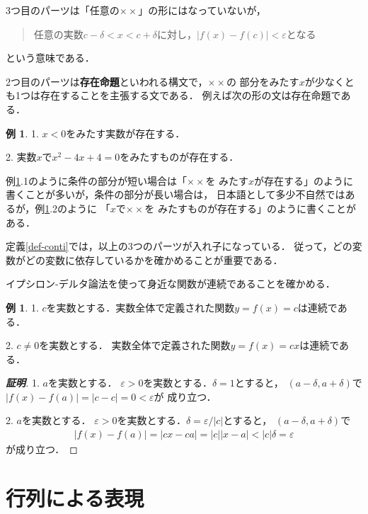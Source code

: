 \documentclass[11pt, a4paper, dvipdfmx]{jsarticle}
\theoremstyle{definition}
\newtheorem{Example}[Axiom]{例}
\newcommand{\e}{\varepsilon} %
\theoremstyle{mystyle}
\numberwithin{equation}{section} %
\begin{document}
3つ目のパーツは「任意の$\times\times$」の形にはなっていないが，
\begin{quote}
    任意の実数$c-\delta <x<c+\delta$に対し，$|f(x)-f(c)|<\e$となる
\end{quote}
という意味である．

2つ目のパーツは\textbf{存在命題}といわれる構文で，$\times\times$の
部分をみたす$x$が少なくとも1つは存在することを主張する文である．
例えば次の形の文は存在命題である．

\begin{Example}\label{ex-exist}
    1. 
    $x<0$をみたす実数が存在する．

    2. 
    実数$x$で$x^2-4x+4=0$をみたすものが存在する．
\end{Example}

例\ref{ex-exist}.1のように条件の部分が短い場合は「$\times\times$を
みたす$x$が存在する」のように書くことが多いが，条件の部分が長い場合は，
日本語として多少不自然ではあるが，例\ref{ex-exist}.2のように
「$x$で$\times\times$を
みたすものが存在する」のように書くことがある．

定義\ref{def-conti}では，以上の3つのパーツが入れ子になっている．
従って，どの変数がどの変数に依存しているかを確かめることが重要である．

イプシロン-デルタ論法を使って身近な関数が連続であることを確かめる．
\begin{Example}

    1. 
    $c$を実数とする．実数全体で定義された関数$y=f(x)=c$は連続である．

    2. 
    $c\neq0$を実数とする．
    実数全体で定義された関数$y=f(x)=cx$は連続である．
\end{Example}

\begin{proof}[{\bf 証明}]
    1. 
    $a$を実数とする．
    $\e>0$を実数とする．$\delta=1$とすると，
    $(a-\delta,a+\delta)$で$|f(x)-f(a)|=|c-c|=0<\e$が
    成り立つ．

    2. 
    $a$を実数とする．
    $\e>0$を実数とする．$\delta=\e/|c|$とすると，
    $(a-\delta,a+\delta)$で
    \begin{align*}
        |f(x)-f(a)|=|cx-ca|=|c||x-a|<|c|\delta=\e
    \end{align*}
    が成り立つ．
\end{proof}
\section{行列による表現}\label{sec-la}
\end{document}
